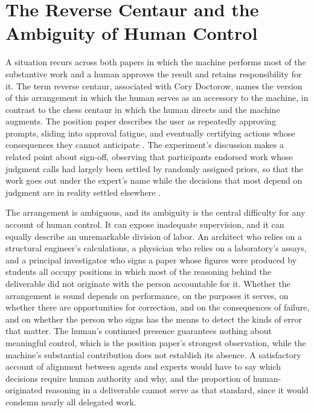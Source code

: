 \documentclass[11pt]{article}
\begin{document}
\section{The Reverse Centaur and the Ambiguity of Human Control}

A situation recurs across both papers in which the machine performs most of the substantive work and a human approves the result and retains responsibility for it. The term reverse centaur, associated with Cory Doctorow, names the version of this arrangement in which the human serves as an accessory to the machine, in contrast to the chess centaur in which the human directs and the machine augments. The position paper describes the user as repeatedly approving prompts, sliding into approval fatigue, and eventually certifying actions whose consequences they cannot anticipate \cite{mitchell}. The experiment's discussion makes a related point about sign-off, observing that participants endorsed work whose judgment calls had largely been settled by randomly assigned priors, so that the work goes out under the expert's name while the decisions that most depend on judgment are in reality settled elsewhere \cite{herdagdelen}.

The arrangement is ambiguous, and its ambiguity is the central difficulty for any account of human control. It can expose inadequate supervision, and it can equally describe an unremarkable division of labor. An architect who relies on a structural engineer's calculations, a physician who relies on a laboratory's assays, and a principal investigator who signs a paper whose figures were produced by students all occupy positions in which most of the reasoning behind the deliverable did not originate with the person accountable for it. Whether the arrangement is sound depends on performance, on the purposes it serves, on whether there are opportunities for correction, and on the consequences of failure, and on whether the person who signs has the means to detect the kinds of error that matter. The human's continued presence guarantees nothing about meaningful control, which is the position paper's strongest observation, while the machine's substantial contribution does not establish its absence. A satisfactory account of alignment between agents and experts would have to say which decisions require human authority and why, and the proportion of human-originated reasoning in a deliverable cannot serve as that standard, since it would condemn nearly all delegated work.
\end{document}
